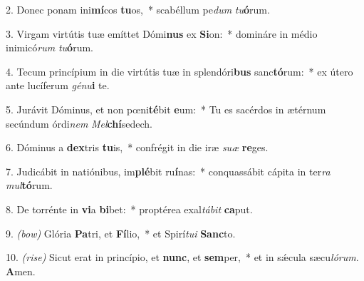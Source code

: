 2. Donec ponam ini\textbf{mí}cos \textbf{tu}os,~*
	scabéllum pe\textit{dum} \textit{tu}\textbf{ó}rum.

3. Virgam virtútis tuæ emíttet Dómi\textbf{nus} ex \textbf{Si}on:~*
	domináre in médio inimicó\textit{rum} \textit{tu}\textbf{ó}rum.

4. Tecum princípium in die virtútis tuæ in splendóri\textbf{bus} sanc\textbf{tó}rum:~*
	ex útero ante lucíferum \textit{gé}\textit{nu}\textbf{i} te.

5. Jurávit Dóminus, et non p{\oe}ni\textbf{té}\-bit \textbf{e}um:~*
	Tu es sacérdos in ætérnum secúndum órdi\textit{nem} \textit{Mel}\textbf{chí}se\-dech.

6. Dóminus a \textbf{dex}tris \textbf{tu}is,~*
	confrégit in die iræ \textit{su}\textit{æ} \textbf{re}ges.

7. Judicábit in natiónibus, im\textbf{plé}bit ru\textbf{í}nas:~*
	conquassábit cápita in ter\textit{ra} \textit{mul}\textbf{tó}rum.

8. De torrénte in \textbf{vi}a \textbf{bi}bet:~*
	proptérea exal\textit{tá}\textit{bit} \textbf{ca}put.

9. \textit{(bow)} Glória \textbf{Pa}tri, et \textbf{Fí}lio,~*
	et Spirí\textit{tu}\textit{i} \textbf{Sanc}to.

10. \textit{(rise)} Sicut erat in princípio, et \textbf{nunc}, et \textbf{sem}per,~*
	et in s\'{\ae}cula sæcu\textit{ló}\textit{rum}. \textbf{A}men.